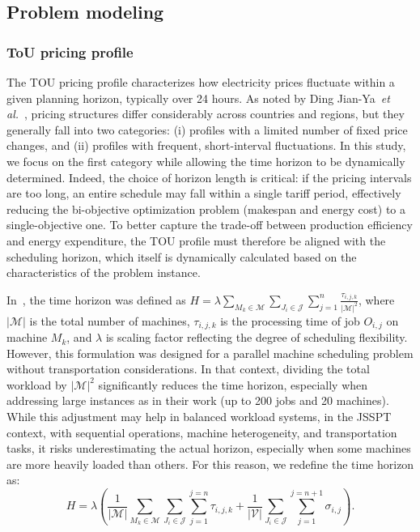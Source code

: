 \documentclass[preprint, 3p, review, 12pt]{elsarticle}
\begin{document}
\subsection{Problem modeling}

\subsubsection{ToU pricing profile}
The TOU pricing profile characterizes how electricity prices fluctuate within a given planning horizon, typically over 24 hours. As noted by Ding Jian-Ya~\textit{et al.}~\cite{7349258}, pricing structures differ considerably across countries and regions, but they generally fall into two categories: (i) profiles with a limited number of fixed price changes, and (ii) profiles with frequent, short-interval fluctuations. In this study, we focus on the first category while allowing the time horizon to be dynamically determined. Indeed, the choice of horizon length is critical: if the pricing intervals are too long, an entire schedule may fall within a single tariff period, effectively reducing the bi-objective optimization problem (makespan and energy cost) to a single-objective one. To better capture the trade-off between production efficiency and energy expenditure, the TOU profile must therefore be aligned with the scheduling horizon, which itself is dynamically calculated based on the characteristics of the problem instance.

In~\cite{7349258}, the time horizon was defined as $H = \displaystyle \lambda \sum_{M_k \in \mathcal{M}}\sum_{J_i \in \mathcal{J}} \sum_{j=1}^n \frac{\tau_{i,j,k}}{|\mathcal{M}|^2}$, where $|\mathcal{M}|$ is the total number of machines, $\tau_{i,j,k}$ is the processing time of job $O_{i,j}$ on machine $M_k$, and $\lambda$ is scaling factor reflecting the degree of scheduling flexibility. However, this formulation was designed for a parallel machine scheduling problem without transportation considerations. In that context, dividing the total workload by $|\mathcal{M}|^2$ significantly reduces the time horizon, especially when addressing large instances as in their work (up to 200 jobs and 20 machines). While this adjustment may help in balanced workload systems, in the JSSPT context, with sequential operations, machine heterogeneity, and transportation tasks, it risks underestimating the actual horizon, especially when some machines are more heavily loaded than others. For this reason, we redefine the time horizon as: 
\begin{equation}
    H = \lambda \left( \frac{1}{|\mathcal{M}|} \sum_{M_k \in \mathcal{M}} \sum_{J_i \in \mathcal{J}}\sum_{j=1}^{j=n} \tau_{i,j,k} + \frac{1}{|\mathcal{V}|} \sum_{J_i \in \mathcal{J}} \sum_{j=1}^{j=n+1} \sigma_{i,j} \right).
\end{equation}
\end{document}
